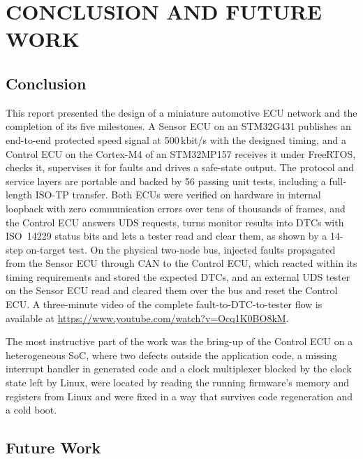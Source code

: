 \chapter{CONCLUSION AND FUTURE WORK}
\label{ch:conclusion}

\section{Conclusion}

This report presented the design of a miniature automotive ECU network and the completion of its five milestones. A Sensor ECU on an STM32G431 publishes an end-to-end protected speed signal at 500\,kbit/s with the designed timing, and a Control ECU on the Cortex-M4 of an STM32MP157 receives it under FreeRTOS, checks it, supervises it for faults and drives a safe-state output. The protocol and service layers are portable and backed by 56 passing unit tests, including a full-length ISO-TP transfer. Both ECUs were verified on hardware in internal loopback with zero communication errors over tens of thousands of frames, and the Control ECU answers UDS requests, turns monitor results into DTCs with ISO~14229 status bits and lets a tester read and clear them, as shown by a 14-step on-target test. On the physical two-node bus, injected faults propagated from the Sensor ECU through CAN to the Control ECU, which reacted within its timing requirements and stored the expected DTCs, and an external UDS tester on the Sensor ECU read and cleared them over the bus and reset the Control ECU. A three-minute video of the complete fault-to-DTC-to-tester flow is available at \url{https://www.youtube.com/watch?v=Ocq1K0BO8kM}.

The most instructive part of the work was the bring-up of the Control ECU on a heterogeneous SoC, where two defects outside the application code, a missing interrupt handler in generated code and a clock multiplexer blocked by the clock state left by Linux, were located by reading the running firmware's memory and registers from Linux and were fixed in a way that survives code regeneration and a cold boot.

\section{Future Work}

